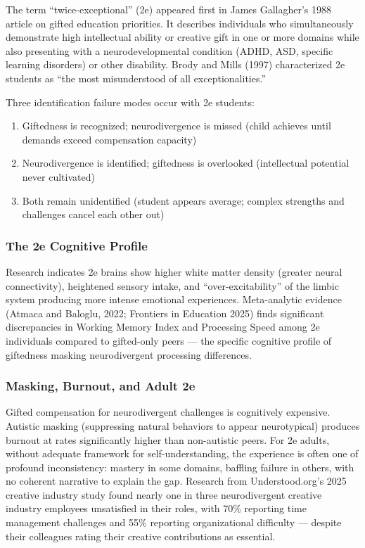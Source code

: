 \documentclass[11pt,letterpaper]{article}
\begin{document}
The term ``twice-exceptional'' (2e) appeared first in James Gallagher's 1988 article on gifted education priorities. It describes individuals who simultaneously demonstrate high intellectual ability or creative gift in one or more domains while also presenting with a neurodevelopmental condition (ADHD, ASD, specific learning disorders) or other disability. Brody and Mills (1997) characterized 2e students as ``the most misunderstood of all exceptionalities.''

Three identification failure modes occur with 2e students:
\begin{enumerate}[leftmargin=*]
  \item Giftedness is recognized; neurodivergence is missed (child achieves until demands exceed compensation capacity)
  \item Neurodivergence is identified; giftedness is overlooked (intellectual potential never cultivated)
  \item Both remain unidentified (student appears average; complex strengths and challenges cancel each other out)
\end{enumerate}

\subsubsection{The 2e Cognitive Profile}

Research indicates 2e brains show higher white matter density (greater neural connectivity), heightened sensory intake, and ``over-excitability'' of the limbic system producing more intense emotional experiences. Meta-analytic evidence (Atmaca and Baloglu, 2022; Frontiers in Education 2025) finds significant discrepancies in Working Memory Index and Processing Speed among 2e individuals compared to gifted-only peers --- the specific cognitive profile of giftedness masking neurodivergent processing differences.

\subsubsection{Masking, Burnout, and Adult 2e}

Gifted compensation for neurodivergent challenges is cognitively expensive. Autistic masking (suppressing natural behaviors to appear neurotypical) produces burnout at rates significantly higher than non-autistic peers. For 2e adults, without adequate framework for self-understanding, the experience is often one of profound inconsistency: mastery in some domains, baffling failure in others, with no coherent narrative to explain the gap. Research from Understood.org's 2025 creative industry study found nearly one in three neurodivergent creative industry employees unsatisfied in their roles, with 70\% reporting time management challenges and 55\% reporting organizational difficulty --- despite their colleagues rating their creative contributions as essential.
\end{document}
